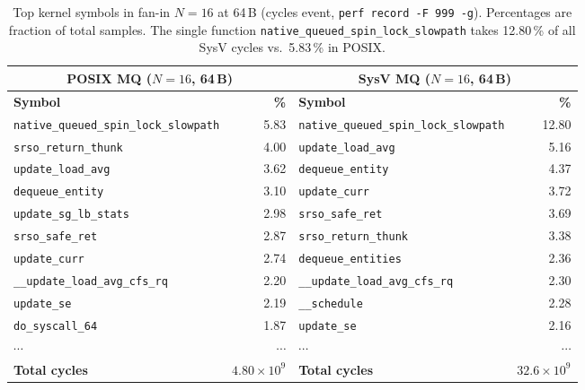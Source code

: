 \documentclass[a4paper,11pt]{article}
\begin{document}
\begin{table}[H]
\centering
\caption{Top kernel symbols in fan-in $N=16$ at 64\,B (cycles event,
\texttt{perf record -F 999 -g}). Percentages are fraction of total
samples. The single function \texttt{native\_queued\_spin\_lock\_slowpath}
takes 12.80\,\% of all SysV cycles vs.\ 5.83\,\% in POSIX.}
\label{tab:fanin_hotfn}
\footnotesize
\begin{tabular}{lrlr}
\toprule
\multicolumn{2}{c}{\textbf{POSIX MQ ($N=16$, 64\,B)}}
& \multicolumn{2}{c}{\textbf{SysV MQ ($N=16$, 64\,B)}} \\
\midrule
\textbf{Symbol} & \textbf{\%}
& \textbf{Symbol} & \textbf{\%} \\
\midrule
\texttt{native\_queued\_spin\_lock\_slowpath} & 5.83 &
\texttt{native\_queued\_spin\_lock\_slowpath} & 12.80 \\
\texttt{srso\_return\_thunk}                  & 4.00 &
\texttt{update\_load\_avg}                    & 5.16 \\
\texttt{update\_load\_avg}                    & 3.62 &
\texttt{dequeue\_entity}                      & 4.37 \\
\texttt{dequeue\_entity}                      & 3.10 &
\texttt{update\_curr}                         & 3.72 \\
\texttt{update\_sg\_lb\_stats}                & 2.98 &
\texttt{srso\_safe\_ret}                      & 3.69 \\
\texttt{srso\_safe\_ret}                      & 2.87 &
\texttt{srso\_return\_thunk}                  & 3.38 \\
\texttt{update\_curr}                         & 2.74 &
\texttt{dequeue\_entities}                    & 2.36 \\
\texttt{\_\_update\_load\_avg\_cfs\_rq}       & 2.20 &
\texttt{\_\_update\_load\_avg\_cfs\_rq}       & 2.30 \\
\texttt{update\_se}                           & 2.19 &
\texttt{\_\_schedule}                         & 2.28 \\
\texttt{do\_syscall\_64}                      & 1.87 &
\texttt{update\_se}                           & 2.16 \\
$\cdots$ & $\cdots$ & $\cdots$ & $\cdots$ \\
\textbf{Total cycles}        & $4.80\times 10^9$ &
\textbf{Total cycles}        & $32.6\times 10^9$ \\
\bottomrule
\end{tabular}
\end{table}
\end{document}
